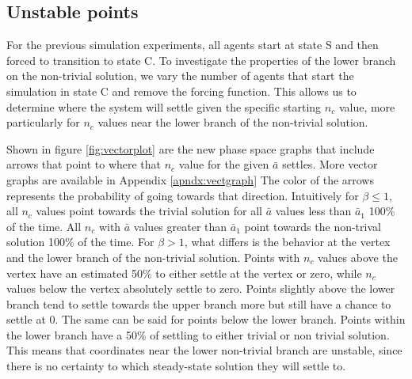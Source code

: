 \subsection{Unstable points}
\hspace{\parindent}For the previous simulation experiments, all agents start at state S and then forced to transition to state C. 
To investigate the properties of the lower branch on the non-trivial solution, we vary the number of agents that start the simulation in state C and remove the forcing function. 
This allows us to determine where the system will settle given the specific starting $n_{c}$ value, more particularly for $n_{c}$ values near the lower branch of the non-trivial solution. 

Shown in figure \ref{fig:vectorplot} are the new phase space graphs that include arrows that point to where that $n_{c}$ value for the given $\bar{a}$ settles.
More vector graphs are available in Appendix \ref{apndx:vectgraph}
The color of the arrows represents the probability of going towards that direction.
Intuitively for $\beta \leq 1$, all $n_{c}$ values point towards the trivial solution for all $\bar{a}$ values less than  $\bar{a}_{1}$ 100\% of the time. 
All $n_{c}$ with $\bar{a}$ values greater than $\bar{a}_{1}$ point towards the non-trival solution 100\% of the time.
For $\beta > 1$, what differs is the behavior at the vertex and the lower branch of the non-trivial solution.
Points with $n_{c}$ values above the vertex have an estimated 50\% to either settle at the vertex or zero, while $n_{c}$ values below the vertex absolutely settle to zero.
Points slightly above the lower branch tend to settle towards the upper branch more but still have a chance to settle at 0.
The same can be said for points below the lower branch.
Points within the lower branch have a 50\% of settling to either trivial or non trivial solution.
This means that coordinates near the lower non-trivial branch are unstable, since there is no certainty to which steady-state solution they will settle to.

